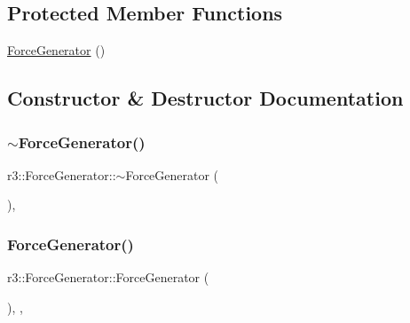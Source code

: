 \subsection*{Protected Member Functions}
\begin{DoxyCompactItemize}
\item 
\mbox{\hyperlink{classr3_1_1_force_generator_a7b21e48ccca59631975e0621057a1035}{Force\+Generator}} ()
\end{DoxyCompactItemize}


\subsection{Constructor \& Destructor Documentation}
\mbox{\label{classr3_1_1_force_generator_a64f1659bd0cf863ea28cccc689b2be3e}} 
\subsubsection{\texorpdfstring{$\sim$\+Force\+Generator()}{~ForceGenerator()}}
{\footnotesize\ttfamily r3\+::\+Force\+Generator\+::$\sim$\+Force\+Generator (\begin{DoxyParamCaption}{ }\end{DoxyParamCaption})\hspace{0.3cm}{\ttfamily [virtual]}, {\ttfamily [default]}}

\mbox{\label{classr3_1_1_force_generator_a7b21e48ccca59631975e0621057a1035}} 
\subsubsection{\texorpdfstring{Force\+Generator()}{ForceGenerator()}}
{\footnotesize\ttfamily r3\+::\+Force\+Generator\+::\+Force\+Generator (\begin{DoxyParamCaption}{ }\end{DoxyParamCaption})\hspace{0.3cm}{\ttfamily [explicit]}, {\ttfamily [protected]}, {\ttfamily [default]}}



